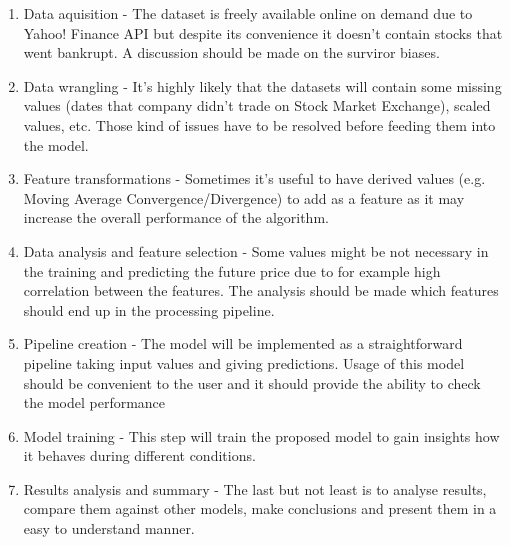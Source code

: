 \begin{enumerate}
	\item Data aquisition - The dataset is freely available online on demand due to Yahoo! Finance API but despite its convenience it doesn't contain stocks that went bankrupt. A discussion should be made on the surviror biases.
	\item Data wrangling - It's highly likely that the datasets will contain some missing values (dates that company didn't trade on Stock Market Exchange), scaled values, etc. Those kind of issues have to be resolved before feeding them into the model.
	\item Feature transformations - Sometimes it's useful to have derived values (e.g. Moving Average Convergence/Divergence) to add as a feature as it may increase the overall performance of the algorithm.
	\item Data analysis and feature selection - Some values might be not necessary in the training and predicting the future price due to for example high correlation between the features. The analysis should be made which features should end up in the processing pipeline.
	\item Pipeline creation - The model will be implemented as a straightforward pipeline taking input values and giving predictions. Usage of this model should be convenient to the user and it should provide the ability to check the model performance
	\item Model training - This step will train the proposed model to gain insights how it behaves during different conditions.
	\item Results analysis and summary - The last but not least is to analyse results, compare them against other models, make conclusions and present them in a easy to understand manner. 
\end{enumerate}
